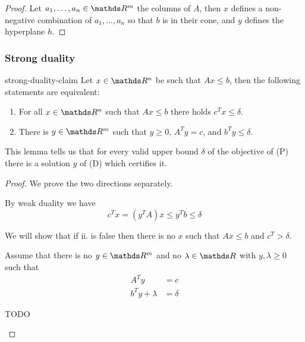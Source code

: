 \documentclass[12pt]{extarticle}
\begin{document}
\begin{proof}
	Let $a_1, \dots, a_n \in \R^m$ the columns of $A$, then $x$ defines a non-negative combination of
	$a_1, \dots, a_n$ so that $b$ is in their cone, and $y$ defines the hyperplane $h$.
\end{proof}

\subsubsection{Strong duality}

\begin{lemma}{}{strong-duality-claim}
	Let $x\in \R^n$ be such that $Ax \leq b$, then the following statements are equivalent:
	\begin{enumerate}[label=\roman*.]
		\item For all $x\in \R^n$ such that $Ax \leq b$ there holds $c^T x \leq \delta$.
		\item There is $y \in \R^m$ such that $y \geq 0$, $A^T y = c$, and $b^T y \leq \delta$.
	\end{enumerate}
\end{lemma}

This lemma tells us that for every valid upper bound $\delta$ of the objective of (P) there is a
solution $y$ of (D) which certifies it.

\begin{proof}
	We prove the two directions separately.
	\begin{description}[font=\normalfont\itshape]
		\item[i. $\implies$ ii.]
		      By weak duality we have
		      \begin{equation}
			      c^T x = (y^T A)x \leq y^T b \leq \delta
		      \end{equation}
		\item[ii. $\implies$ i.] We will show that if ii. is false then there is no $x$ such that
		      $Ax \leq b$ and $c^T > \delta$.

		      Assume that there is no $y \in \R^m$ and no $\lambda \in \R$ with $y, \lambda \geq 0$
		      such that
		      \begin{align}
			      A^Ty         & = c      \\
			      b^Ty+\lambda & = \delta
		      \end{align}

		      TODO
		      \qedhere
	\end{description}
\end{proof}
\end{document}
